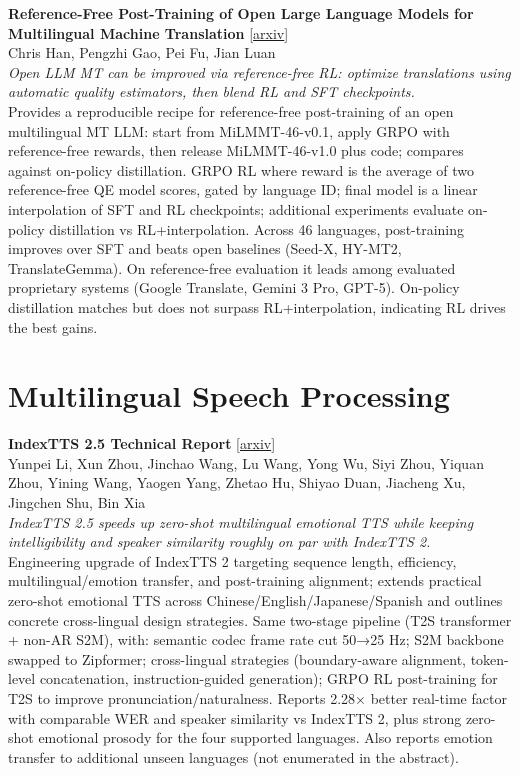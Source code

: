 \documentclass[12pt,letterpaper]{article}
\begin{document}
\medskip

{\small\textbf{Reference-Free Post-Training of Open Large Language Models for Multilingual Machine Translation}} {\scriptsize[\href{https://arxiv.org/abs/2608.10812}{arxiv}]}\\
{\scriptsize Chris Han, Pengzhi Gao, Pei Fu, Jian Luan}\\

{\small\textit{Open LLM MT can be improved via reference-free RL: optimize translations using automatic quality estimators, then blend RL and SFT checkpoints.}}\\[1pt]
{\footnotesize Provides a reproducible recipe for reference-free post-training of an open multilingual MT LLM: start from MiLMMT-46-v0.1, apply GRPO with reference-free rewards, then release MiLMMT-46-v1.0 plus code; compares against on-policy distillation. GRPO RL where reward is the average of two reference-free QE model scores, gated by language ID; final model is a linear interpolation of SFT and RL checkpoints; additional experiments evaluate on-policy distillation vs RL+interpolation. Across 46 languages, post-training improves over SFT and beats open baselines (Seed-X, HY-MT2, TranslateGemma). On reference-free evaluation it leads among evaluated proprietary systems (Google Translate, Gemini 3 Pro, GPT-5). On-policy distillation matches but does not surpass RL+interpolation, indicating RL drives the best gains.}

\medskip


\section*{Multilingual Speech Processing}

{\small\textbf{IndexTTS 2.5 Technical Report}} {\scriptsize[\href{https://arxiv.org/abs/2601.03888}{arxiv}]}\\
{\scriptsize Yunpei Li, Xun Zhou, Jinchao Wang, Lu Wang, Yong Wu, Siyi Zhou, Yiquan Zhou, Yining Wang, Yaogen Yang, Zhetao Hu, Shiyao Duan, Jiacheng Xu, Jingchen Shu, Bin Xia}\\

{\small\textit{IndexTTS 2.5 speeds up zero-shot multilingual emotional TTS while keeping intelligibility and speaker similarity roughly on par with IndexTTS 2.}}\\[1pt]
{\footnotesize Engineering upgrade of IndexTTS 2 targeting sequence length, efficiency, multilingual/emotion transfer, and post-training alignment; extends practical zero-shot emotional TTS across Chinese/English/Japanese/Spanish and outlines concrete cross-lingual design strategies. Same two-stage pipeline (T2S transformer + non-AR S2M), with: semantic codec frame rate cut 50→25 Hz; S2M backbone swapped to Zipformer; cross-lingual strategies (boundary-aware alignment, token-level concatenation, instruction-guided generation); GRPO RL post-training for T2S to improve pronunciation/naturalness. Reports 2.28× better real-time factor with comparable WER and speaker similarity vs IndexTTS 2, plus strong zero-shot emotional prosody for the four supported languages. Also reports emotion transfer to additional unseen languages (not enumerated in the abstract).}
\end{document}
